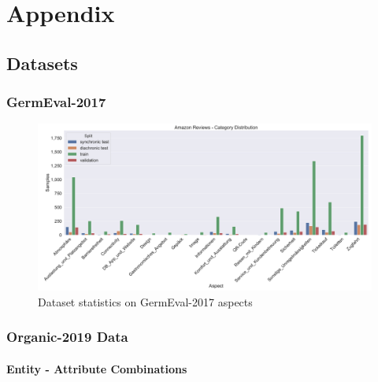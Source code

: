 \chapter{Appendix}

\section{Datasets}


\subsection{GermEval-2017}
\begin{figure}[H]
	\centering
	\includegraphics[width=\textwidth]{figures/08_appendix/08_germevalAspects}
	\caption{Dataset statistics on GermEval-2017 aspects}
	\label{fig:08_germEvalStatistics}
\end{figure}

\subsection{Organic-2019 Data}

\subsubsection*{Entity - Attribute Combinations}

